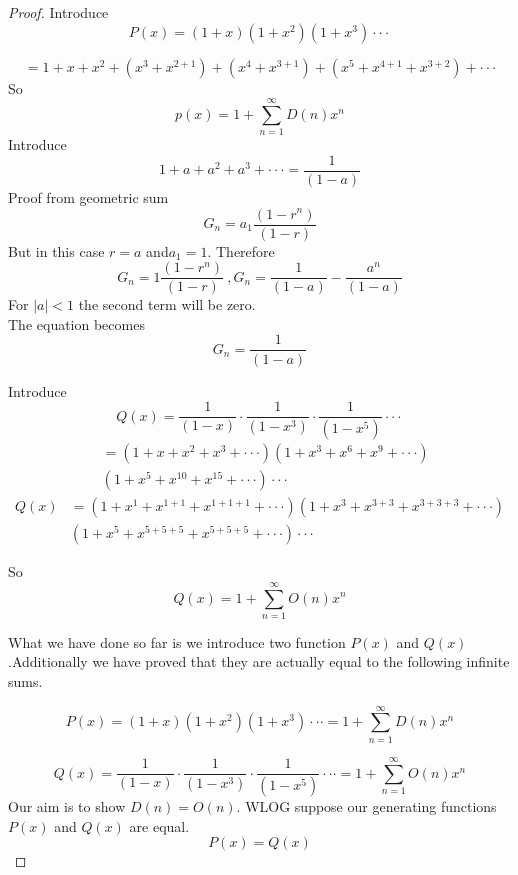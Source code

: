 \documentclass[12pt]{article}
\begin{document}
\begin{flushright}
\end{flushright}
\begin{proof}
 Introduce
$$
P(x)=(1+x)(1+x^2 )(1+x^3 )\cdot\cdot\cdot
$$

$$
=1+x+x^2+(x^3+x^{2+1} )+(x^4+x^{3+1} )+(x^5+x^{4+1}  +x^{3+2} )+ \cdot\cdot\cdot
$$
So
\begin{equation}
p(x)=1+\sum_{n=1}^\infty D(n) x^n
\end{equation}
Introduce
$$
1+a+a^2+a^3+\cdot\cdot\cdot=\frac{1}{(1-a)}
$$
Proof from geometric sum
$$G_n=a_1\frac{(1-r^n)}{(1-r)}$$
But in this case $r=a$ and$a_1=1.$ Therefore
$$
G_n=1\frac{(1-r^n)}{(1-r)}~,
G_n=\frac{1}{(1-a)}-\frac{a^n}{(1-a)}
$$
For $|a|<1$ the second term will be zero.\\
The equation becomes
$$G_n=\frac{1}{(1-a)}$$

Introduce
$$
Q(x)=\frac{1}{(1-x)}\cdot \frac{1}{(1-x^3)}\cdot \frac{1}{(1-x^5)}\cdot\cdot\cdot
$$
\begin{align*}
&=(1+x+x^2+x^3+\cdot\cdot\cdot)(1+x^3+x^6+x^9+\cdot\cdot\cdot)\\
& (1+x^5+x^{10}+x^{15}+\cdot\cdot\cdot)\cdot\cdot\cdot
\end{align*}
\begin{align*}
Q(x)&= (1+x^1+x^{1+1}+x^{1+1+1}+\cdot\cdot\cdot)(1+x^3+x^{3+3}+x^{3+3+3}+\cdot\cdot\cdot)\\
    & (1+x^5+x^{5+5+5}+x^{5+5+5}+\cdot\cdot\cdot)\cdot\cdot\cdot
\end{align*}

So
\begin{equation}
Q(x)=1+\sum_{n=1}^\infty O(n)x^n
\end{equation}

What we have done so far is we introduce two function $P(x)$ and $Q(x)$.Additionally we  have proved that they are actually equal to the following infinite sums.

$$P(x)=(1+x)(1+x^2)(1+x^3)\cdot\cdot\cdot=1+\sum_{n=1}^\infty D(n) x^n$$

$$
Q(x)=\frac{1}{(1-x)}\cdot\frac{1}{(1-x^3)}\cdot \frac{1}{(1-x^5)}\cdot\cdot\cdot=1+\sum_{n=1}^\infty O(n)x^n
$$
Our aim is to show $D(n) =O(n)$. WLOG suppose our generating functions $P(x)$ and $Q(x)$ are equal.
$$P(x) =Q(x)$$


\end{proof}
\end{document}
